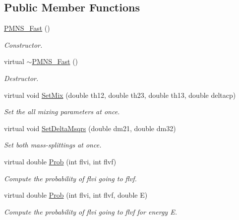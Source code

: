 \subsection*{Public Member Functions}
\begin{DoxyCompactItemize}
\item 
\hyperlink{classOscProb_1_1PMNS__Fast_a2bbac744bf63753105d766a860af7c0d}{P\+M\+N\+S\+\_\+\+Fast} ()
\begin{DoxyCompactList}\small\item\em Constructor. \end{DoxyCompactList}\item 
virtual \hyperlink{classOscProb_1_1PMNS__Fast_ae1b797dda260ff83793cdfe448f58878}{$\sim$\+P\+M\+N\+S\+\_\+\+Fast} ()
\begin{DoxyCompactList}\small\item\em Destructor. \end{DoxyCompactList}\item 
virtual void \hyperlink{classOscProb_1_1PMNS__Fast_ad849b2231d99c5d66fb3ade8efb896e1}{Set\+Mix} (double th12, double th23, double th13, double deltacp)
\begin{DoxyCompactList}\small\item\em Set the all mixing parameters at once. \end{DoxyCompactList}\item 
virtual void \hyperlink{classOscProb_1_1PMNS__Fast_a63733b246e6d2e609ce3de7a65ba5b9f}{Set\+Delta\+Msqrs} (double dm21, double dm32)
\begin{DoxyCompactList}\small\item\em Set both mass-\/splittings at once. \end{DoxyCompactList}\item 
virtual double \hyperlink{classOscProb_1_1PMNS__Base_aec5c399b93261f1962a4b7dbbb44b973}{Prob} (int flvi, int flvf)
\begin{DoxyCompactList}\small\item\em Compute the probability of flvi going to flvf. \end{DoxyCompactList}\item 
virtual double \hyperlink{classOscProb_1_1PMNS__Base_aa3cee10639d5c0879ccb9e78d62128d3}{Prob} (int flvi, int flvf, double E)
\begin{DoxyCompactList}\small\item\em Compute the probability of flvi going to flvf for energy E. \end{DoxyCompactList}\item 

\end{DoxyCompactItemize}
